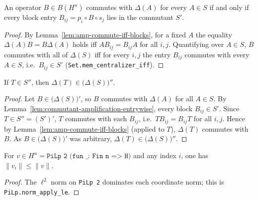 \begin{lemma}
    \label{lem:commutant-amplification-entrywise}
    \leanok
    An operator $B \in B(H^n)$ commutes with $\Delta(A)$ for every $A \in S$ if
    and only if every block entry $B_{ij} = p_i \circ B \circ s_j$ lies in the
    commutant $S'$.
\end{lemma}
\begin{proof}
    By Lemma~\ref{lem:amp-commute-iff-blocks}, for a fixed $A$ the equality
    $\Delta(A) B = B \Delta(A)$ holds iff $A B_{ij} = B_{ij} A$ for all $i, j$.
    Quantifying over $A \in S$, $B$ commutes with all of $\Delta(S)$ iff for every
    $i, j$ the entry $B_{ij}$ commutes with every $A \in S$, i.e.\ $B_{ij} \in S'$
    (\texttt{Set.mem\_centralizer\_iff}).
\end{proof}

\begin{lemma}
    \label{lem:amplification-double-commutant}
    \leanok
    If $T \in S''$, then $\Delta(T) \in \bigl(\Delta(S)\bigr)''$.
\end{lemma}
\begin{proof}
    Let $B \in \bigl(\Delta(S)\bigr)'$, so $B$ commutes with $\Delta(A)$ for all
    $A \in S$. By Lemma~\ref{lem:commutant-amplification-entrywise}, every block
    $B_{ij} \in S'$. Since $T \in S'' = (S')'$, $T$ commutes with each $B_{ij}$,
    i.e.\ $T B_{ij} = B_{ij} T$ for all $i, j$. Hence by
    Lemma~\ref{lem:amp-commute-iff-blocks} (applied to $T$), $\Delta(T)$ commutes
    with $B$. As $B \in \bigl(\Delta(S)\bigr)'$ was arbitrary,
    $\Delta(T) \in \bigl(\Delta(S)\bigr)''$.
\end{proof}

\begin{lemma}
    \label{lem:coord-norm-le}
    \leanok
    For $v \in H^n = \texttt{PiLp 2 (fun \_ : Fin n => H)}$ and any index $i$,
    one has $\|v_i\| \le \|v\|$.
\end{lemma}
\begin{proof}
    The $\ell^2$ norm on \texttt{PiLp 2} dominates each coordinate norm; this is
    \texttt{PiLp.norm\_apply\_le}.
\end{proof}

